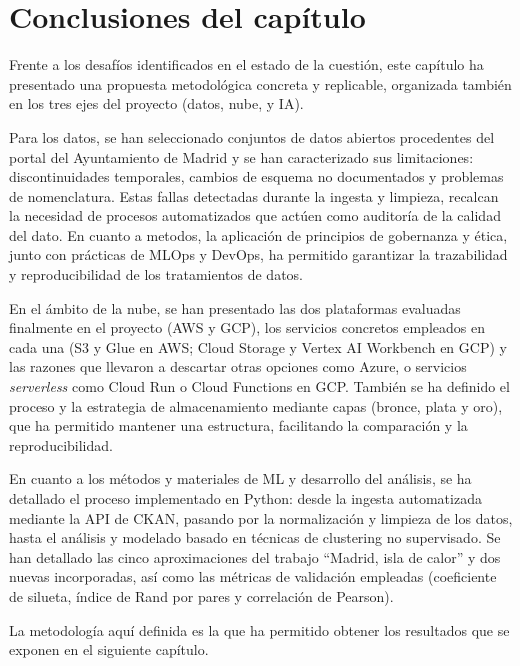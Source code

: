 \section{Conclusiones del capítulo}

Frente a los desafíos identificados en el estado de la cuestión, este capítulo ha presentado una propuesta metodológica concreta y replicable, organizada también en los tres ejes del proyecto (datos, nube, y IA).

Para los datos, se han seleccionado conjuntos de datos abiertos procedentes del portal del Ayuntamiento de Madrid y se han caracterizado sus limitaciones: discontinuidades temporales, cambios de esquema no documentados y problemas de nomenclatura. Estas fallas detectadas durante la ingesta y limpieza, recalcan la necesidad de procesos automatizados que actúen como auditoría de la calidad del dato. En cuanto a metodos, la aplicación de principios de gobernanza y ética, junto con prácticas de MLOps y DevOps, ha permitido garantizar la trazabilidad y reproducibilidad de los tratamientos de datos.

En el ámbito de la nube, se han presentado las dos plataformas evaluadas finalmente en el proyecto (AWS y GCP), los servicios concretos empleados en cada una (S3 y Glue en AWS; Cloud Storage y Vertex AI Workbench en GCP) y las razones que llevaron a descartar otras opciones como Azure, o servicios \textit{serverless} como Cloud Run o Cloud Functions en GCP. También se ha definido el proceso y la estrategia de almacenamiento mediante capas (bronce, plata y oro), que ha permitido mantener una estructura, facilitando la comparación y la reproducibilidad.

En cuanto a los métodos y materiales de ML y desarrollo del análisis, se ha detallado el proceso implementado en Python: desde la ingesta automatizada mediante la API de CKAN, pasando por la normalización y limpieza de los datos, hasta el análisis y modelado basado en técnicas de clustering no supervisado. Se han detallado las cinco aproximaciones del trabajo ``Madrid, isla de calor'' y dos nuevas incorporadas, así como las métricas de validación empleadas (coeficiente de silueta, índice de Rand por pares y correlación de Pearson).

La metodología aquí definida es la que ha permitido obtener los resultados que se exponen en el siguiente capítulo.
